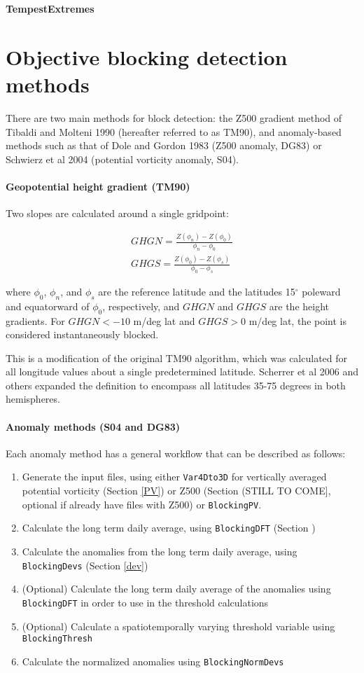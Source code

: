 \documentclass{article}
\begin{document}
{\Huge \textbf{TempestExtremes}}


\tableofcontents

\section{Objective blocking detection methods}

There are two main methods for block detection: the Z500 gradient method of Tibaldi and Molteni 1990 (hereafter referred to as TM90), and anomaly-based methods such as that of Dole and Gordon 1983 (Z500 anomaly, DG83) or Schwierz et al 2004 (potential vorticity anomaly, S04). 

\paragraph{Geopotential height gradient (TM90)} Two slopes are calculated around a single gridpoint:

\begin{eqnarray}
GHGN=\frac{Z(\phi_n)-Z(\phi_0)}{\phi_n-\phi_0}\\
GHGS=\frac{Z(\phi_0)-Z(\phi_s)}{\phi_0-\phi_s}
\end{eqnarray}

\noindent where $\phi_0$, $\phi_n$, and $\phi_s$ are the reference latitude and the latitudes 15$^\circ$ poleward and equatorward of $\phi_0$, respectively, and $GHGN$ and $GHGS$ are the height gradients. For $GHGN<-10$ m/deg lat and $GHGS>0$ m/deg lat, the point is considered instantaneously blocked.

This is a modification of the original TM90 algorithm, which was calculated for all longitude values about a single predetermined latitude. Scherrer et al 2006 and others expanded the definition to encompass all latitudes 35-75 degrees in both hemispheres.


\paragraph{Anomaly methods (S04 and DG83)} Each anomaly method has a general workflow that can be described as follows:

\begin{enumerate}
\item Generate the input files, using either \texttt{Var4Dto3D} for vertically averaged potential vorticity (Section \ref{PV}) or Z500 (Section (STILL TO COME], optional if already have files with Z500) or \texttt{BlockingPV}.
\item Calculate the long term daily average, using \texttt{BlockingDFT} (Section )
\item Calculate the anomalies from the long term daily average, using \texttt{BlockingDevs} (Section \ref{dev})
\item (Optional) Calculate the long term daily average of the anomalies using \texttt{BlockingDFT} in order to use in the threshold calculations
\item (Optional) Calculate a spatiotemporally varying threshold variable using \texttt{BlockingThresh}
\item Calculate the normalized anomalies using \texttt{BlockingNormDevs}
\end{enumerate}
\end{document}
